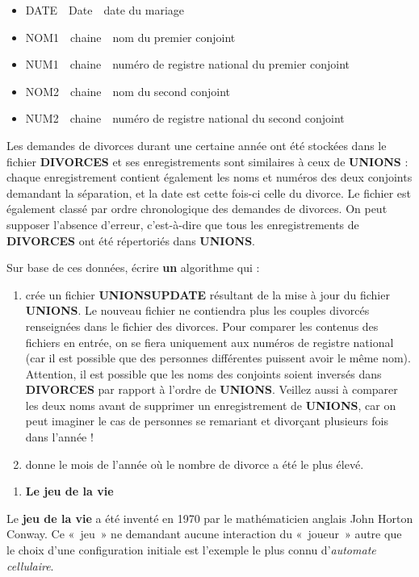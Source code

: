 \liststyleListi
\begin{itemize}
\item {
DATE\ \ Date\ \ date du mariage}
\item {
NOM1\ \ chaine\ \ nom du premier conjoint}
\item {
NUM1\ \ chaine\ \ numéro de registre national du premier conjoint}
\item {
NOM2\ \ chaine\ \ nom du second conjoint}
\item {
NUM2\ \ chaine\ \ numéro de registre national du second conjoint}
\end{itemize}
{
{Les demandes de divorces durant une certaine
année ont été stockées dans le fichier
}{\textbf{DIVORCES}}{
et ses enregistrements sont similaires à ceux de
}{\textbf{UNIONS}}{ :
chaque enregistrement contient également les noms et numéros des deux
conjoints demandant la séparation, et la date est cette fois-ci celle
du divorce. Le fichier est également classé par ordre chronologique des
demandes de divorces. On peut supposer l’absence d’erreur, c’est-à-dire
que tous les enregistrements de
}{\textbf{DIVORCES}}{
ont été répertoriés dans
}{\textbf{UNIONS}}{.}}

{
{Sur base de ces données, écrire
}{\textbf{un}}{
algorithme qui :}}

\liststyleNumberingi
\begin{enumerate}
\item {
{crée un fichier
}{\textbf{UNIONSUPDATE}}{
résultant de la mise à jour du fichier
}{\textbf{UNIONS}}{. Le
nouveau fichier ne contiendra plus les couples divorcés renseignées
dans le fichier des divorces. Pour comparer les contenus des fichiers
en entrée, on se fiera uniquement aux numéros de registre national (car
il est possible que des personnes différentes puissent avoir le même
nom). Attention, il est possible que les noms des conjoints soient
inversés dans
}{\textbf{DIVORCES}}{
par rapport à l’ordre de
}{\textbf{UNIONS}}{.
Veillez aussi à comparer les deux noms avant de supprimer un
enregistrement de
}{\textbf{UNIONS}}{,
car on peut imaginer le cas de personnes se remariant et divorçant
plusieurs fois dans l’année !}}
\item {
donne le mois de l’année où le nombre de divorce a été le plus élevé.}
\end{enumerate}

\bigskip

\liststyleExercice
\begin{enumerate}
\item {\sffamily\bfseries
Le jeu de la vie}
\end{enumerate}
{
{Le }{\textbf{jeu de la
vie}}{ a été inventé en 1970 par le
mathématicien anglais John Horton Conway. Ce «~jeu~» ne demandant
aucune interaction du «~joueur~» autre que le choix d’une configuration
initiale est l’exemple le plus connu
d’}{\textit{automate
cellulaire}}{.}}


